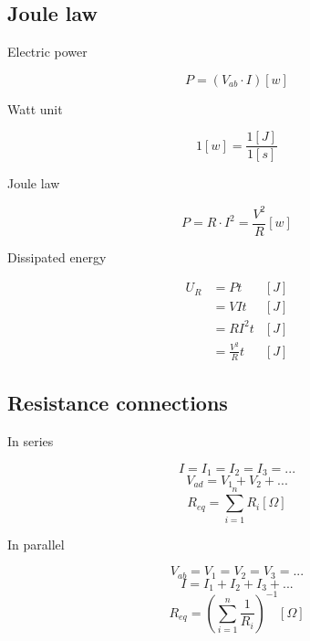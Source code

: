 \documentclass[letterpaper]{article}
\newcommand{\divline}{\noindent\makebox[\linewidth]{\rule{\textwidth}{0.4pt}}}
\begin{document}
    \begin{multicols}{2}
        \section{Joule law}

        Electric power

        \[P = ( V_{ab} \cdot I ) [w]\]

        Watt unit

        \[1[w] = \frac{1[J]}{1[s]}\]

        Joule law

        \[P = R \cdot I^{2} = \frac{V^{2}}{R} [w]\]

        Dissipated energy

        \begin{align*}
            U_{R} & = P t & [J] \\
                & = V I t & [J] \\
                & = R I^{2} t & [J] \\
                & = \frac{V^{2}}{R} t & [J]
        \end{align*}
    \end{multicols}
    \divline

    \begin{multicols}{2}
        \section{Resistance connections}

        In series

        \[I = I_1 = I_2 = I_3 = ...\]
        \[V_{ad} = V_1 + V_2 + ... \]
        \[R_{eq} = \sum_{i = 1}^{n} R_i [\Omega] \]

        In parallel

        \[V_{ab} = V_1 = V_2 = V_3 = ...\]
        \[I = I_1 + I_2 + I_3 + ...\]
        \[R_{eq} = \left( \sum_{i=1}^{n} \frac{1}{R_{i}} \right)^{-1} [\Omega]\]
    \end{multicols}
    \divline
\end{document}
